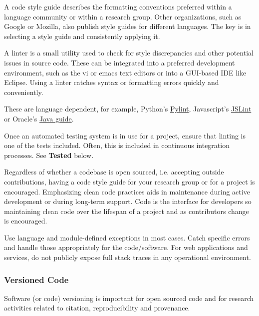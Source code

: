 \documentclass{article}
\newcounter{subsubsubsection}[subsubsection]
\begin{document}
A code style guide describes the formatting conventions preferred within a language community or within a research group. Other organizations, such as Google or Mozilla, also publish style guides for different languages. The key is in selecting a style guide and consistently applying it. 

A linter is a small utility used to check for style discrepancies and other potential issues in source code. These can be integrated into a preferred development environment, such as the vi or emacs text editors or into a GUI-based IDE like Eclipse. Using a linter catches syntax or formatting errors quickly and conveniently.
 
These are language dependent, for example, Python’s \href{https://www.pylint.org/} {Pylint}, Javascript’s \href{https://github.com/douglascrockford/JSLint} {JSLint} or Oracle’s \href{http://www.oracle.com/technetwork/java/codeconvtoc-136057.html} {Java guide}.

Once an automated testing system is in use for a project, ensure that linting is one of the tests included. Often, this is included in continuous integration processes. See \textbf{Tested} below. 
 
Regardless of whether a codebase is open sourced, i.e. accepting outside contributions, having a code style guide for your research group or for a project is encouraged. Emphasizing clean code practices aids in maintenance during active development or during long-term support. Code is the interface for developers so maintaining clean code over the lifespan of a project and as contributors change is encouraged.

Use language and module-defined exceptions in most cases. Catch specific errors and handle those appropriately for the code/software. For web applications and services, do not publicly expose full stack traces in any operational environment.

\subsubsection{Versioned Code}
Software (or code) versioning is important for open sourced code and for research activities related to citation, reproducibility \autocite{stodden_best_2014} and provenance.
\end{document}
